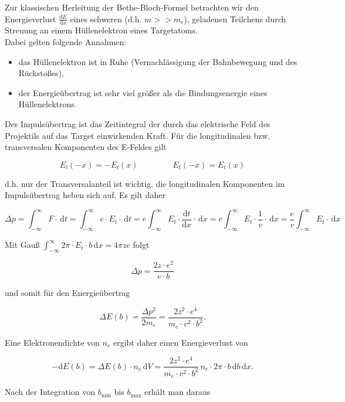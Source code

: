 \FloatBarrier
Zur klassischen Herleitung der Bethe-Bloch-Formel betrachten wir den Energieverlust
$\frac{\mathrm{d}E}{\mathrm{d}x}$ eines schweren (d.h. $m>>m_e$), geladenen Teilchens durch Streuung an einem Hüllenelektron eines
Targetatoms.
\\
Dabei gelten folgende Annahmen:
\begin{itemize}
  \item das Hüllenelektron ist in Ruhe (Vernachlässigung der Bahnbewegung und des Rückstoßes),
  \item der Energieübertrag ist sehr viel größer als die Bindungsenergie eines Hüllenelektrons.
\end{itemize}


\begin{figure}[H]
		\centering
		
\end{figure}


Der Impulsübertrag ist das Zeitintegral der durch das elektrische Feld des Projektils auf das
Target einwirkenden Kraft. Für die longitudinalen bzw. transversalen Komponenten des E-Feldes gilt

\[E_l(-x)=-E_l(x)~~~~~~~~~~~~~~~~~~~E_t(-x)=E_t(x)\]

d.h. nur der Transversalanteil ist wichtig, die longitudinalen Komponenten im Impulsübertrag heben
sich auf. Es gilt daher

\[\Delta p= \int_{-\infty}^{\infty}F\cdot\, \mathrm{d}t = \int_{-\infty}^{\infty}e\cdot E_t\cdot\,
\mathrm{d}t = e\int_{-\infty}^{\infty}E_t\cdot\frac{\mathrm{d}t}{\mathrm{d}x}\cdot\, \mathrm{d}x
=e\int_{-\infty}^{\infty}E_t\cdot\frac{1}{v}\cdot\, \mathrm{d}x
=\frac{e}{v}\int_{-\infty}^{\infty}E_t\cdot\, \mathrm{d}x\]

Mit Gauß $\int_{-\infty}^{\infty}2\pi\cdot E_t\cdot b\,\mathrm{d}x=4\pi ze$ folgt

\[\Delta p = \frac{2z\cdot e^2}{v\cdot b}\]

und somit für den Energieübertrag

\[\Delta E(b)=\frac{\Delta p^2}{2m_e}=\frac{2z^2\cdot e^4}{m_e\cdot v^2 \cdot b^2} .\]

Eine Elektronendichte von $n_e$ ergibt daher einen Energieverlust von 

\[-\mathrm{d}E(b)=\Delta E(b)\cdot n_e\,\mathrm{d}V=\frac{2z^2\cdot e^4}{m_e\cdot v^2\cdot
b^2}\, n_e\cdot 2\pi\cdot b\, \mathrm{d}b\, \mathrm{d}x.\]

Nach der Integration von $b_{\text{min}}$ bis $b_{\text{max}}$ erhält man daraus

